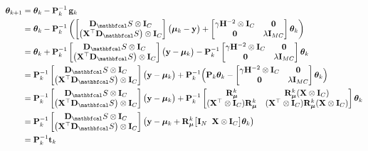 \begin{align*}
    \thetaa_{k+1} &= \thetaa_k - \PP^{-1}_k \, \g_k\\
    &= \thetaa_k - \PP^{-1}_k \left(\begin{bmatrix}
        \D_\St \otimes \I_C \\ \left(\X^\top \D_\St\right) \otimes \I_C
    \end{bmatrix} \big(\muu_k - \y\big) + \begin{bmatrix}
        \gamma \HH^{-2} \otimes \I_C & \zero \\
    \zero & \lambda \I_{MC}
    \end{bmatrix} \thetaa_k \right) \\
    &= \thetaa_k + \PP^{-1}_k \begin{bmatrix}
        \D_\St \otimes \I_C \\ \left(\X^\top \D_\St\right) \otimes \I_C
    \end{bmatrix} \big(\y - \muu_k\big) - \PP^{-1}_k  \begin{bmatrix}
        \gamma \HH^{-2} \otimes \I_C & \zero \\
    \zero & \lambda \I_{MC}
    \end{bmatrix} \thetaa_k \\
    &= \PP^{-1}_k \begin{bmatrix}
        \D_\St \otimes \I_C \\ \left(\X^\top \D_\St\right) \otimes \I_C
    \end{bmatrix} \big(\y - \muu_k\big) + \PP^{-1}_k \Big(\PP_k \thetaa_k - \begin{bmatrix}
        \gamma \HH^{-2} \otimes \I_C & \zero \\
    \zero & \lambda \I_{MC}
    \end{bmatrix} \thetaa_k\Big) \\
    &= \PP^{-1}_k \begin{bmatrix}
        \D_\St \otimes \I_C \\ \left(\X^\top \D_\St\right) \otimes \I_C
    \end{bmatrix} \big(\y - \muu_k\big) + \PP^{-1}_k \begin{bmatrix}
        \RR_{\muu}^k & \RR_{\muu}^k (\X \otimes \I_C) \\ 
        (\X^\top \otimes \I_C) \RR_{\muu}^k  & (\X^\top \otimes \I_C) \RR_{\muu}^k (\X \otimes \I_C) 
    \end{bmatrix} \thetaa_k \\
    &= \PP^{-1}_k  \begin{bmatrix}
        \D_\St \otimes \I_C \\ \left(\X^\top \D_\St\right) \otimes \I_C
    \end{bmatrix} \left( \y - \muu_k + \RR_{\muu}^k  \big[\I_N \;\; \X \otimes \I_C\big] \thetaa_k \right) \\
    &= \PP^{-1}_k \tee_k
\end{align*}

